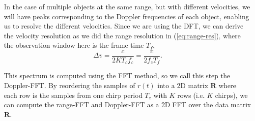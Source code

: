 In the case of multiple objects at the same range, but with different
velocities, we will have peaks corresponding to the Doppler frequencies of each
object, enabling us to resolve the different velocities. Since we are using the
DFT, we can derive the velocity resolution as we did the range resolution in
(\ref{eq:range-res}), where the observation window here is the frame time $T_f$,
\begin{equation}
	\Delta v = \frac{c}{2 K T_c f_c} = \frac{c}{2 f_c T_f}.
\end{equation}

This spectrum is computed using the FFT method, so we call
this step the Doppler-FFT. By reordering the samples of $r(t)$ into a 2D matrix
$\bm{R}$ where each row is the samples from one chirp period $T_c$ with $K$ rows
(i.e. $K$ chirps), we can compute the range-FFT and Doppler-FFT as a 2D FFT over
the data matrix $\bm{R}$. 
